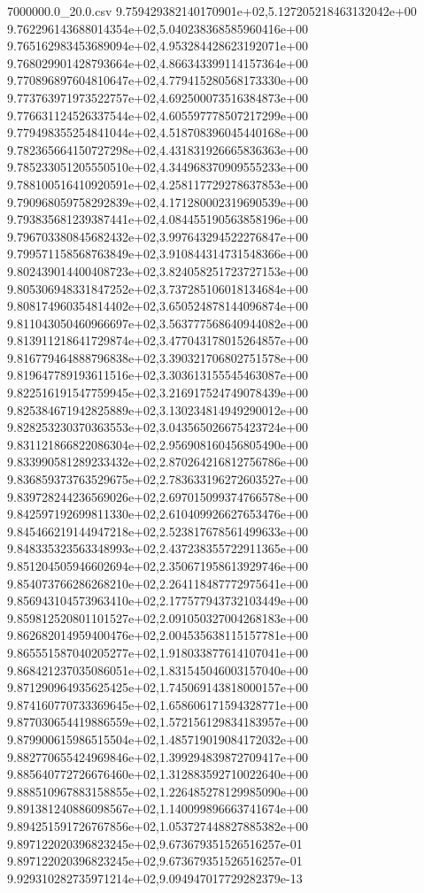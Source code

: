 \begin{filecontents*}{7000000.0_20.0.csv}
9.759429382140170901e+02,5.127205218463132042e+00
9.762296143688014354e+02,5.040238368585960416e+00
9.765162983453689094e+02,4.953284428623192071e+00
9.768029901428793664e+02,4.866343399114157364e+00
9.770896897604810647e+02,4.779415280568173330e+00
9.773763971973522757e+02,4.692500073516384873e+00
9.776631124526337544e+02,4.605597778507217299e+00
9.779498355254841044e+02,4.518708396045440168e+00
9.782365664150727298e+02,4.431831926665836363e+00
9.785233051205550510e+02,4.344968370909555233e+00
9.788100516410920591e+02,4.258117729278637853e+00
9.790968059758292839e+02,4.171280002319690539e+00
9.793835681239387441e+02,4.084455190563858196e+00
9.796703380845682432e+02,3.997643294522276847e+00
9.799571158568763849e+02,3.910844314731548366e+00
9.802439014400408723e+02,3.824058251723727153e+00
9.805306948331847252e+02,3.737285106018134684e+00
9.808174960354814402e+02,3.650524878144096874e+00
9.811043050460966697e+02,3.563777568640944082e+00
9.813911218641729874e+02,3.477043178015264857e+00
9.816779464888796838e+02,3.390321706802751578e+00
9.819647789193611516e+02,3.303613155545463087e+00
9.822516191547759945e+02,3.216917524749078439e+00
9.825384671942825889e+02,3.130234814949290012e+00
9.828253230370363553e+02,3.043565026675423724e+00
9.831121866822086304e+02,2.956908160456805490e+00
9.833990581289233432e+02,2.870264216812756786e+00
9.836859373763529675e+02,2.783633196272603527e+00
9.839728244236569026e+02,2.697015099374766578e+00
9.842597192699811330e+02,2.610409926627653476e+00
9.845466219144947218e+02,2.523817678561499633e+00
9.848335323563348993e+02,2.437238355722911365e+00
9.851204505946602694e+02,2.350671958613929746e+00
9.854073766286268210e+02,2.264118487772975641e+00
9.856943104573963410e+02,2.177577943732103449e+00
9.859812520801101527e+02,2.091050327004268183e+00
9.862682014959400476e+02,2.004535638115157781e+00
9.865551587040205277e+02,1.918033877614107041e+00
9.868421237035086051e+02,1.831545046003157040e+00
9.871290964935625425e+02,1.745069143818000157e+00
9.874160770733369645e+02,1.658606171594328771e+00
9.877030654419886559e+02,1.572156129834183957e+00
9.879900615986515504e+02,1.485719019084172032e+00
9.882770655424969846e+02,1.399294839872709417e+00
9.885640772726676460e+02,1.312883592710022640e+00
9.888510967883158855e+02,1.226485278129985090e+00
9.891381240886098567e+02,1.140099896663741674e+00
9.894251591726767856e+02,1.053727448827885382e+00
9.897122020396823245e+02,9.673679351526516257e-01
9.897122020396823245e+02,9.673679351526516257e-01
9.929310282735971214e+02,9.094947017729282379e-13
\end{filecontents*}

